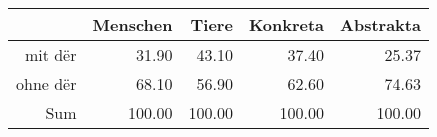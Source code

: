 \begin{tabular}{rrrrr}
  \hline
 & Menschen & Tiere & Konkreta & Abstrakta \\ 
  \hline
mit dër & 31.90 & 43.10 & 37.40 & 25.37 \\ 
  ohne dër & 68.10 & 56.90 & 62.60 & 74.63 \\ 
  Sum & 100.00 & 100.00 & 100.00 & 100.00 \\ 
   \hline
\end{tabular}
